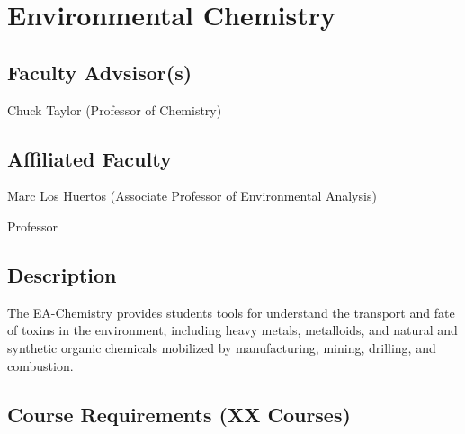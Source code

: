 \documentclass{article}\usepackage[]{graphicx}\usepackage[]{xcolor}
\newenvironment{itemize*}%
  {\begin{itemize}%
    \setlength{\itemsep}{0pt}%
    \setlength{\parskip}{0pt}}%
  {\end{itemize}}
\begin{document}
\newpage %
\section{Environmental Chemistry}



\subsection{Faculty Advsisor(s)}

\begin{itemize*}
  \item Chuck Taylor (Professor of Chemistry)
\end{itemize*}

\subsection{Affiliated Faculty}

\begin{itemize*}
  \item Marc Los Huertos (Associate Professor of Environmental Analysis)
  \item Professor
\end{itemize*}

\subsection{Description}

The EA-Chemistry provides students tools for understand the transport and fate of toxins in the environment, including heavy metals, metalloids, and natural and synthetic organic chemicals mobilized by manufacturing, mining, drilling, and combustion. 

\subsection{Course Requirements (XX Courses)}
\end{document}
